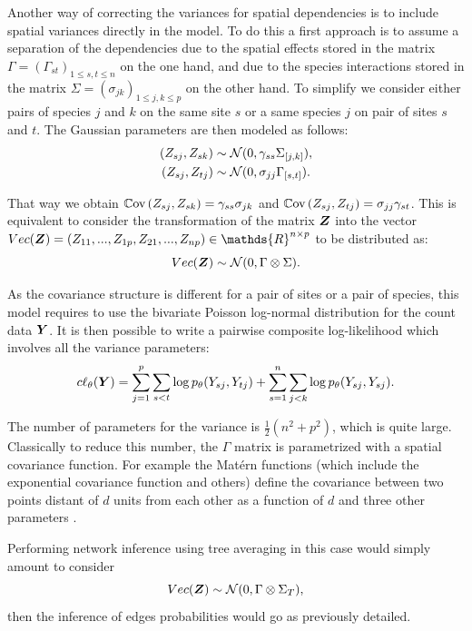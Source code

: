
Another way of correcting the variances for spatial dependencies is to include spatial variances directly in the model. To do this a first approach is to assume a separation of the dependencies due to the spatial effects stored in the matrix $\Gamma=(\Gamma_{st})_{1\leq s,t\leq n}$ on the one hand, and due to the species interactions stored in the matrix $\Sigma=(\sigma_{jk})_{1\leq j,k\leq p}$ on the other hand. To simplify we consider either pairs of species $j$ and $k$ on the same site $s$ or a same species $j$ on pair of sites $s$ and $t$. The Gaussian parameters are then modeled as follows:
\begin{align*}
(Z_{sj},Z_{sk}) &\sim \mathcal{N}(0, \gamma_{ss} \Sigma_{[j,k]}),\\
(Z_{sj},Z_{tj}) &\sim \mathcal{N}(0, \sigma_{jj} \Gamma_{[s,t]}).
\end{align*}

That way we obtain $\operatorname*{\mathbb{C}\text{ov}}{(Z_{sj},Z_{sk})} = \gamma_{ss} \sigma_{jk}$ and $\operatorname*{\mathbb{C}\text{ov}}{(Z_{sj},Z_{tj})} =  \sigma_{jj}\gamma_{st}$. This is equivalent to consider the transformation of the matrix ${\boldsymbol{Z}}$ into the vector $Vec(\Zbf) = (Z_{11},..., Z_{1p},Z_{21},...,Z_{np}) \in \mathds{R}^{n\times p}$ to be distributed as:
$$Vec({\boldsymbol{Z}}) \sim \mathcal{N}(0,\Gamma \otimes \Sigma).$$ 

As the covariance structure is different for a pair of sites or a pair of species, this model requires to use the bivariate Poisson log-normal distribution for the count data ${\boldsymbol{Y}}$.
It is then possible to write a pairwise composite log-likelihood which involves all the variance parameters:
$$c\ell_\theta({\boldsymbol{Y}}) = \sum_{j=1}^p \sum_{s<t} \log p_\theta(Y_{sj}, Y_{tj})+\sum_{s=1}^n \sum_{j<k} \log p_\theta(Y_{sj}, Y_{sj}).$$

The number of parameters for the variance is $\frac{1}{2}(n^2+ p^2)$, which is quite large. Classically to reduce this number, the $\Gamma$ matrix is parametrized with a spatial covariance function.  For example the Matérn functions (which include the exponential covariance function and others) define the covariance between two points distant of $d$ units from each other as a function of $d$ and three other parameters \citep{CW15}.

Performing network inference using tree averaging in this case would simply amount to consider 
$$Vec({\boldsymbol{Z}}) \sim \mathcal{N}(0,\Gamma \otimes \Sigma_T),$$
then the inference of edges probabilities would go as previously detailed.
 
